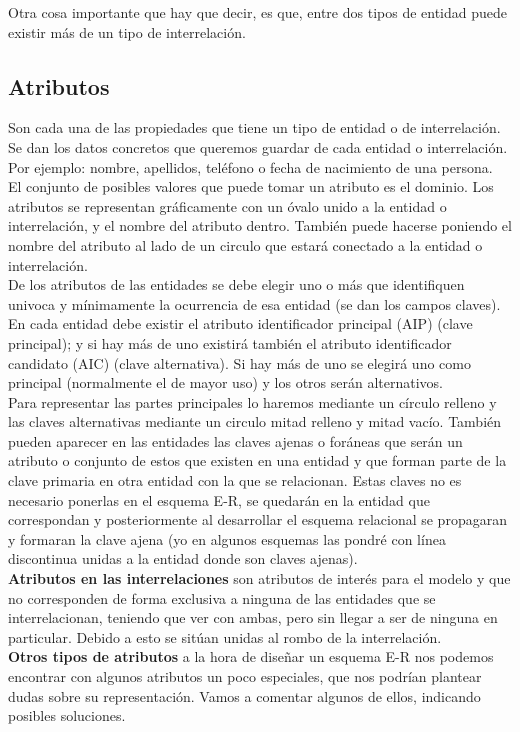 \documentclass{article}
\begin{document}
Otra cosa importante que hay que decir, es que, entre dos tipos de entidad puede existir más de un tipo de interrelación.
\newpage
\subsection{Atributos}
Son cada una de las propiedades que tiene un tipo de entidad o de interrelación. Se dan los datos concretos que queremos guardar de cada entidad o interrelación. 
Por ejemplo: nombre, apellidos, teléfono o fecha de nacimiento de una persona.\\
El conjunto de posibles valores que puede tomar un atributo es el dominio. Los atributos se representan gráficamente con un óvalo unido a la entidad o interrelación, 
y el nombre del atributo dentro. También puede hacerse poniendo el nombre del atributo al lado de un circulo que estará conectado a la entidad o interrelación.\\
De los atributos de las entidades se debe elegir uno o más que identifiquen univoca y mínimamente la ocurrencia de esa entidad (se dan los campos claves). 
En cada entidad debe existir el atributo identificador principal (AIP) (clave principal); y si hay más de uno existirá también el atributo identificador candidato 
(AIC) (clave alternativa). Si hay más de uno se elegirá uno como principal (normalmente el de mayor uso) y los otros serán alternativos.\\
Para representar las partes principales lo haremos mediante un círculo relleno y las claves alternativas mediante un circulo mitad relleno y mitad vacío.
También pueden aparecer en las entidades las claves ajenas o foráneas que serán un atributo o conjunto de estos que existen en una entidad y que forman parte de la clave 
primaria en otra entidad con la que se relacionan. Estas claves no es necesario ponerlas en el esquema E-R, se quedarán en la entidad que correspondan y posteriormente al 
desarrollar el esquema relacional se propagaran y formaran la clave ajena (yo en algunos esquemas las pondré con línea discontinua unidas a la entidad donde son claves ajenas).
\\
\textbf{Atributos en las interrelaciones} son atributos de interés para el modelo y que no corresponden de forma exclusiva a ninguna de las entidades que se interrelacionan, 
teniendo que ver con ambas, pero sin llegar a ser de ninguna en particular. Debido a esto se sitúan unidas al rombo de la interrelación.
\\
\textbf{Otros tipos de atributos} a la hora de diseñar un esquema E-R nos podemos encontrar con algunos atributos un poco especiales, que nos podrían plantear dudas sobre su 
representación. Vamos a comentar algunos de ellos, indicando posibles soluciones.
\end{document}
